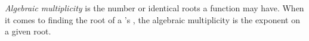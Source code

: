 \begin{definition}\label{def:Algebraic_Multiplicity}
  \emph{Algebraic multiplicity} is the number or identical roots a function may have.
  When it comes to finding the root of a 's , the algebraic multiplicity is the exponent on a given root.
\end{definition}


